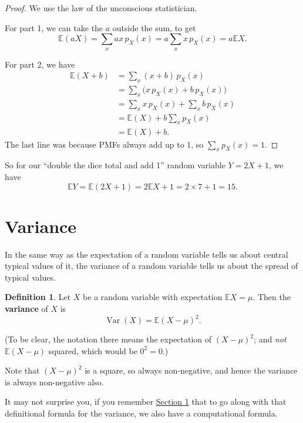 \documentclass[
  a4paper,
]{book}
\theoremstyle{definition}
\newtheorem{definition}{Definition}[chapter]
\theoremstyle{definition}
\theoremstyle{definition}
\theoremstyle{definition}
\theoremstyle{remark}
\begin{document}
\begin{proof}
We use the law of the unconscious statistician.

For part 1, we can take the \(a\) outside the sum, to get
\[ \mathbb E(aX) = \sum_x ax\, p_X(x) = a\sum_x x\, p_X(x) = a\mathbb EX . \]

For part 2, we have
\begin{align*}
  \mathbb E(X+b) &= \sum_x (x + b)\, p_X(x) \\
    &= \sum_x \big( x\, p_X(x) + b\,p_X(x) \big) \\
    &= \sum_x x\, p_X(x) + \sum_x b\,p_X(x) \\
    &= \mathbb E(X) + b \sum_x p_X(x) \\
    &= \mathbb E(X) + b .
\end{align*}
The last line was because PMFs always add up to 1, so \(\sum_x p_X(x) = 1\).
\end{proof}

So for our ``double the dice total and add 1'' random variable \(Y = 2X + 1\), we have
\[ \mathbb EY = \mathbb E(2X+1) = 2\mathbb EX + 1 = 2\times 7 + 1 = 15. \]

\hypertarget{variance}{%
\section{Variance}\label{variance}}

\newcommand{\Var}{\operatorname{Var}}

In the same way as the expectation of a random variable tells us about central typical values of it, the variance of a random variable tells us about the spread of typical values.

\begin{definition}
Let \(X\) be a random variable with expectation \(\mathbb EX = \mu\). Then the \textbf{variance} of \(X\) is
\[ \operatorname{Var}(X) = \mathbb E(X - \mu)^2 . \]
\end{definition}

(To be clear, the notation there means the expectation of \((X-\mu)^2\); and \emph{not} \(\mathbb E(X - \mu)\) squared, which would be \(0^2 = 0\).)

Note that \((X - \mu)^2\) is a square, so always non-negative, and hence the variance is always non-negative also.

It may not surprise you, if you remember \protect\hyperlink{S01-eda}{Section 1} that to go along with that definitional formula for the variance, we also have a computational formula.
\end{document}

